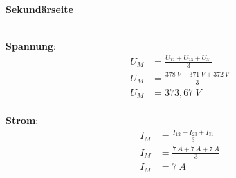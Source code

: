\begin{enumerate}[label=\alph*)]
	      \textbf{Sekundärseite}\\ \ \\
	      \begin{minipage}{0.5\textwidth}
		      \textbf{Spannung}:
		      \begin{align*}
			      U_M & = \frac{U_{12} + U_{23} + U_{31}}{3} \\
			      U_M & = \frac{378\ V + 371\ V + 372\ V}{3} \\
			      U_M & = 373,67\ V                          \\
		      \end{align*}
	      \end{minipage}\hfill
	      \begin{minipage}{0.5\textwidth}
		      \textbf{Strom}:
		      \begin{align*}
			      I_M & = \frac{I_{12} + I_{23} + I_{31}}{3} \\
			      I_M & = \frac{7\ A + 7\ A + 7\ A}{3}       \\
			      I_M & = 7\ A                               \\
		      \end{align*}
	      \end{minipage}


\end{enumerate}
